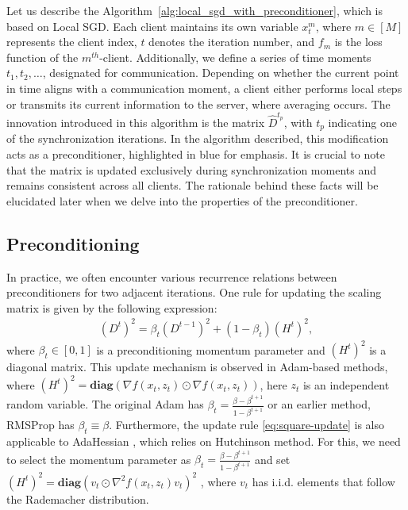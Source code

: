 \documentclass[sn-mathphys,Numbered]{sn-jnl}%
\renewcommand{\|}{\parallel}
\renewcommand {\*} {\ast}
\begin{document}
   
Let us describe the Algorithm~\ref{alg:local_sgd_with_preconditioner},  
which is based on Local SGD. Each client maintains its own variable 
$x_t^m$, where $m \in [M]$ 
represents the client index,
$t$ denotes the iteration number, and  
$f_m$ 
is the loss function of the 
$m^{th}$-client. 
Additionally, we define a series of time moments 
$t_1, t_2, \ldots$, designated for communication. Depending on whether the current point in time aligns with a communication moment, a client either performs local steps or transmits its current information to the server, where averaging occurs. The innovation introduced in this algorithm is the matrix 
$\hat{D}^{t_p}$, with $t_p$
indicating one of the synchronization iterations. In the algorithm described, this modification acts as a preconditioner, highlighted in blue for emphasis. It is crucial to note that the matrix is updated exclusively during synchronization moments and remains consistent across all clients. The rationale behind these facts will be elucidated later when we delve into the properties of the preconditioner.

\subsection{Preconditioning}
In practice, we often encounter various recurrence relations between preconditioners for two adjacent iterations. One rule for updating the scaling matrix is given by the following expression:
\begin{align}
    \label{eq:square-update}
    (D^{t})^2 = \beta_t(D^{t-1})^2 + (1 - \beta_t)(H^{t})^2,
\end{align}
where $\beta_t \in \left[0, 1\right]$ is a preconditioning momentum parameter and $(H^t)^2$ is a diagonal matrix. This update mechanism is observed in Adam-based methods, where  
$(H^t)^2 = \textbf{diag}\left(\nabla f(x_t, z_t) \odot \nabla f(x_t, z_t)\right)$,
here $z_t$ is an independent random variable.
The original Adam \cite{kingma2014adam} has $\beta_t = \frac{\beta - \beta^{t+1}}{1 - \beta^{t+1}}$ 
or an earlier method, RMSProp \cite{tieleman2012lecture} has $\beta_t \equiv \beta$. 
Furthermore, the update rule \eqref{eq:square-update} is also applicable to AdaHessian \cite{yao2021adahessian}, which relies on Hutchinson method. 
For this, we need to select the momentum parameter as 
$\beta_t = \frac{\beta - \beta^{t+1}}{1 - \beta^{t+1}}$
  and set 
 $(H^t)^2 = \textbf{diag}\left(v_t \odot \nabla^2 f(x_t, z_t) v_t \right)^2$
 , where 
 $v_t$ has i.i.d. elements that 
  follow the Rademacher distribution.
\end{document}
